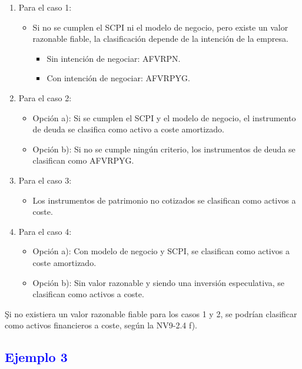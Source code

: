 \begin{enumerate}
    \item Para el caso 1:
    \begin{itemize}
        \item Si no se cumplen el SCPI ni el modelo de negocio, pero existe un valor razonable fiable, la clasificación depende de la intención de la empresa.
        \begin{itemize}
            \item Sin intención de negociar: AFVRPN.
            \item Con intención de negociar: AFVRPYG.
        \end{itemize}
    \end{itemize}

    \item Para el caso 2:
    \begin{itemize}
        \item Opción a): Si se cumplen el SCPI y el modelo de negocio, el instrumento de deuda se clasifica como activo a coste amortizado.
        \item Opción b): Si no se cumple ningún criterio, los instrumentos de deuda se clasifican como AFVRPYG.
    \end{itemize}

    \item Para el caso 3: 
    \begin{itemize}
        \item Los instrumentos de patrimonio no cotizados se clasifican como activos a coste.
    \end{itemize}

    \item Para el caso 4:
    \begin{itemize}
        \item Opción a): Con modelo de negocio y SCPI, se clasifican como activos a coste amortizado.
        \item Opción b): Sin valor razonable y siendo una inversión especulativa, se clasifican como activos a coste.
    \end{itemize}
\end{enumerate}

\c{Si no existiera un valor razonable fiable para los casos 1 y 2, se podrían clasificar como activos financieros a coste, según la NV9-2.4 f).}

\subsection*{\textcolor{blue}{Ejemplo 3}}

